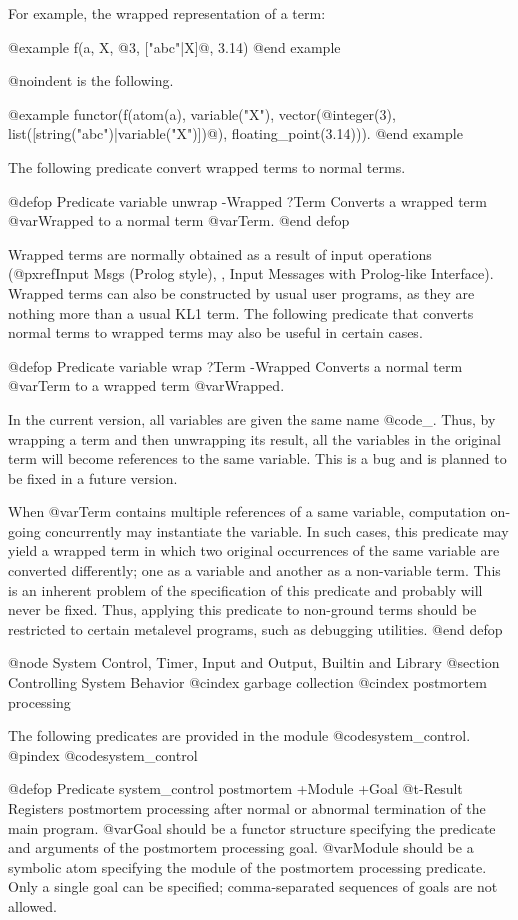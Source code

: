 {{{{For example, the wrapped representation of a term:

@example
f(a, X, @{3, ["abc"|X]@}, 3.14)
@end example

@noindent
is the following.

@example
functor(f(atom(a),
        variable("X"),
        vector(@{integer(3), list([string("abc")|variable("X")])@}),
        floating_point(3.14))).
@end example

The following predicate convert wrapped terms to normal terms.

@defop {Predicate} {variable} unwrap -Wrapped ?Term
Converts a wrapped term @var{Wrapped} to a normal term @var{Term}.
@end defop

Wrapped terms are normally obtained as a result of input operations
(@pxref{Input Msgs (Prolog style), , Input Messages with Prolog-like
Interface}).  Wrapped terms can also be constructed by usual user
programs, as they are nothing more than a usual KL1 term.  The following
predicate that converts normal terms to wrapped terms may also be useful
in certain cases.

@defop {Predicate} {variable} wrap ?Term -Wrapped
Converts a normal term @var{Term} to a wrapped term @var{Wrapped}.

In the current version, all variables are given the same name @code{_}.
Thus, by wrapping a term and then unwrapping its result, all the
variables in the original term will become references to the same
variable.  This is a bug and is planned to be fixed in a future version.

When @var{Term} contains multiple references of a same variable,
computation on-going concurrently may instantiate the variable.  In such
cases, this predicate may yield a wrapped term in which two original
occurrences of the same variable are converted differently; one as a
variable and another as a non-variable term.  This is an inherent
problem of the specification of this predicate and probably will never
be fixed.  Thus, applying this predicate to non-ground terms should be
restricted to certain metalevel programs, such as debugging utilities.
@end defop

@node System Control, Timer, Input and Output, Builtin and Library
@section Controlling System Behavior
@cindex garbage collection
@cindex postmortem processing

The following predicates are provided in the module
@code{system_control}.
@pindex @code{system_control}

@defop {Predicate} {system_control} postmortem +Module +Goal @t{-}Result
Registers postmortem processing after normal or abnormal termination of
the main program.  @var{Goal} should be a functor structure specifying
the predicate and arguments of the postmortem processing goal.
@var{Module} should be a symbolic atom specifying the module of the
postmortem processing predicate.  Only a single goal can be specified;
comma-separated sequences of goals are not allowed.

}}}}
